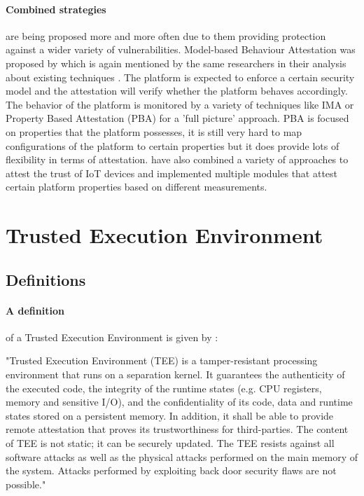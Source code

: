 \documentclass{report}
\begin{document}
\paragraph*{Combined strategies}
are being proposed more and more often due to them providing protection against a wider variety of vulnerabilities. Model-based Behaviour Attestation was proposed by \cite{AlamMasoom2008Mba} which is again mentioned by the same researchers in their analysis about existing techniques \cite{AlamMasoom2012Aoer}. The platform is expected to enforce a certain security model and the attestation will verify whether the platform behaves accordingly. The behavior of the platform is monitored by a variety of techniques like IMA or Property Based Attestation (PBA) for a 'full picture' approach. PBA is focused on properties that the platform possesses, it is still very hard to map configurations of the platform to certain properties but it does provide lots of flexibility in terms of attestation. \cite{MuhlbergJanTobias2016LaFT} have also combined a variety of approaches to attest the trust of IoT devices and implemented multiple modules that attest certain platform properties based on different measurements.

\section{Trusted Execution Environment}

\subsection*{Definitions}

\paragraph*{A definition}
of a Trusted Execution Environment is given by \cite{SabtMohamed2015TEEW}: \begin{displayquote} "Trusted Execution Environment (TEE) is a tamper-resistant processing environment that runs on a separation kernel. It guarantees the authenticity of the executed code, the integrity of the runtime states (e.g. CPU registers, memory and sensitive I/O), and the confidentiality of its code, data and runtime states stored on a persistent memory. In addition, it shall be able to provide remote attestation that proves its trustworthiness for third-parties. The content of TEE is not static; it can be securely updated. The TEE resists against all software attacks as well as the physical attacks performed on the main memory of the system. Attacks performed by exploiting back door security flaws are not possible."
\end{displayquote} 
\end{document}
